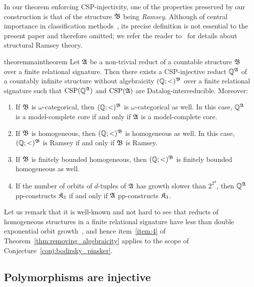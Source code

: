  In our theorem enforcing CSP-injectivity,  one of the properties preserved by our construction is that of the structure $\mathfrak{B}$ being \emph{Ramsey}. Although of central importance in classification methods~\cite{bodirsky_pinsker_ramsey_canonical,Pinsker22}, its precise definition is not essential to the present paper and  therefore omitted; we refer the reader to~\cite{hubickanesetril2019} for details about structural Ramsey theory.  
\begin{restatable}{theorem}{maintheorem}   \label{thm:removing_algebraicity}
Let $\mathfrak{A}$ be a non-trivial reduct of a countable structure $\mathfrak{B}$ over a finite relational signature.
%
Then there exists a CSP-injective reduct $\mathbb{Q}^{\mathfrak{A}}$ of a countably infinite structure without algebraicity $(\mathbb{Q};<)^{\mathfrak{B}}$ over a finite relational signature such that $\mathrm{CSP}(\mathbb{Q}^{\mathfrak{A}})$ and $\mathrm{CSP}(\mathfrak{A})$ are Datalog-interreducible. 
%
Moreover:
% 
\begin{enumerate}
    \item \label{item:1} If $\mathfrak{B}$ is $\omega$-categorical, then $(\mathbb{Q};<)^{\mathfrak{B}}$ is $\omega$-categorical as well. In this case,  
    $\mathbb{Q}^{\mathfrak{A}}$ is a model-complete core if and only if $\mathfrak{A}$ is a  model-complete core.  
\item \label{item:2} If $\mathfrak{B}$ is homogeneous, then $(\mathbb{Q};<)^{\mathfrak{B}}$ is homogeneous as well.
%
In this case, $(\mathbb{Q};<)^{\mathfrak{B}}$ is Ramsey if and only if $\mathfrak{B}$ is Ramsey. 
\item \label{item:3} If $\mathfrak{B}$ is finitely bounded homogeneous, then $(\mathbb{Q};<)^{\mathfrak{B}}$ is finitely bounded homogeneous as well.
\item \label{item:4}  If the number of orbits of $d$-tuples of $\mathfrak{A}$  has growth slower than $2^{2^{d}}$,  then $\mathbb{Q}^{\mathfrak{A}}$ pp-constructs $\mathfrak{K}_3$ if and only if  $\mathfrak{A}$ pp-constructs $\mathfrak{K}_3$. 
%
\end{enumerate}
 
\end{restatable}
 
 Let us remark that it is well-known and not hard to see  that reducts of homogeneous structures in a finite relational signature have less than double exponential orbit growth~\cite{macpherson2011survey}, and hence item~\ref{item:4} of Theorem~\ref{thm:removing_algebraicity} applies to the scope of Conjecture~\ref{conj:bodirsky_pinsker}.   


\subsection{Polymorphisms are injective}
 
